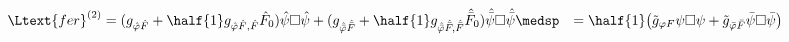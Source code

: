 \begin{equation}
  \label{eq:ord2fer}
\begin{split}
  \Ltext{fer}^{(2)} &= ( g_{\hat{\varphi} \hat{F}} + \half{1} g_{\hat{\varphi} \hat{F},
    \hat{F}} \hat{F}_0 ) \hat{\psi} \Box \hat{\psi} + ( g_{\Hat{\Bar{\varphi}} \Hat{\Bar{F}}} +
      \half{1} g_{\Hat{\Bar{\varphi}} \Hat{\Bar{F}},
    \Hat{\Bar{F}}} \Hat{\Bar{F}}_0 ) \Hat{\Bar{\psi}} \Box
    \Hat{\Bar{\psi}}\medsp
    &=  \half{1} \bigl( \tilde{g}_{\varphi F} \psi \Box \psi +
    \tilde{g}_{\bar{\varphi} \bar{F}} \bar{\psi} \Box \bar{\psi} \bigr)
\end{split}
\end{equation}

